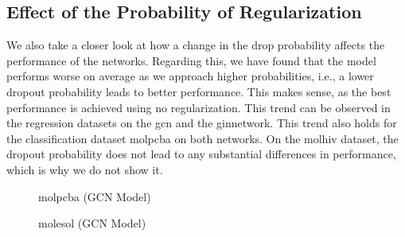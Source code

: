 
\subsection{Effect of the Probability of Regularization}

We also take a closer look at how a change in the drop probability affects the performance of the networks.
Regarding this, we have found that the model performs worse on average as we approach higher probabilities, i.e., a lower dropout probability leads to better performance.
This makes sense, as the best performance is achieved using no regularization.
This trend can be observed in the regression datasets on the \ac{gcn} and the \ac{gin}network. This trend also holds for the classification dataset molpcba on both networks. On the molhiv dataset, the dropout probability does not lead to any substantial differences in performance, which is why we do not show it.


\begin{figure}
    \centering
    \caption{molpcba (GCN Model)}
    \label{fig:prob-gcn-molpcba}
\end{figure}

\begin{figure}
    \centering
    \caption{molesol (GCN Model)}
    \label{fig:prob-gcn-molesol}
\end{figure}


